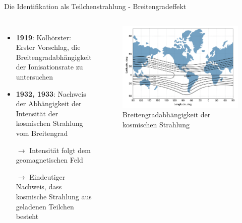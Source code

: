 \documentclass[aspectratio=1610, professionalfonts, 9pt, hyperref={colorlinks=false}]{beamer}
\begin{document}
\begin{frame}{Die Identifikation als Teilchenstrahlung - Breitengradeffekt}
  \begin{columns}
      \begin{itemize}
        \setlength\itemsep{0.5em}
        \item \textbf{1919}: Kolhörster: Erster Vorschlag, die Breitengradabhängigkeit der Ionisationsrate zu untersuchen
        \item \textbf{1932, 1933}: Nachweis der Abhängigkeit der Intensität der kosmischen Strahlung vom Breitengrad
        \item [$\rightarrow$] Intensität folgt dem geomagnetischen Feld
        \item [$\rightarrow$] Eindeutiger Nachweis, dass kosmische Strahlung aus geladenen Teilchen besteht
      \end{itemize}
        \vspace*{10px}
  
      \begin{figure}
          \centering
          \includegraphics[width=\linewidth]{images/scrrenshot}
          \caption{Breitengradabhängigkeit der kosmischen Strahlung \cite{9789400754225}}
      \end{figure}
  \end{columns}
\end{frame}
\end{document}
